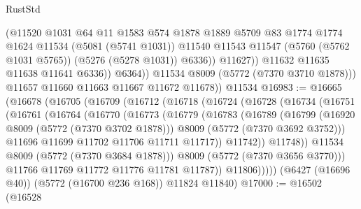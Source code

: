 \begin{lexlean}{RustStd}
\begin{coremodule}
                        (@11520
                          @1031
                          @64
                          @11
                          @1583
                          @574
                          @1878
                          @1889
                          @5709
                          @83
                          @1774
                          @1774
                          @1624
                          @11534
                          (@5081 (@5741 @1031))
                          @11540
                          @11543
                          @11547
                          (@5760 (@5762 @1031 @5765))
                          (@5276 (@5278 @1031))
                          @6336))
                      @11627))
                  @11632
                  @11635
                  @11638
                  @11641
                  @6336))
              @6364))
          @11534
          @8009
          (@5772 (@7370 @3710 @1878)))
        @11657
        @11660
        @11663
        @11667
        @11672
        @11678))
    @11534
@16983 := @16665
    (@16678
      (@16705
        (@16709
          (@16712
            (@16718
              (@16724
                (@16728
                  (@16734
                    (@16751
                      (@16761
                        (@16764
                          (@16770
                            (@16773
                              (@16779
                                (@16783
                                  (@16789
                                    (@16799
                                      (@16920 @8009 (@5772 (@7370 @3702 @1878)))
                                      @8009
                                      (@5772 (@7370 @3692 @3752)))
                                    @11696
                                    @11699
                                    @11702
                                    @11706
                                    @11711
                                    @11717))
                                @11742))
                            @11748))
                        @11534
                        @8009
                        (@5772 (@7370 @3684 @1878)))
                      @8009
                      (@5772 (@7370 @3656 @3770)))
                    @11766
                    @11769
                    @11772
                    @11776
                    @11781
                    @11787))
                @11806)))))
      (@6427 (@16696 @40))
      (@5772 (@16700 @236 @168))
      @11824
      @11840)
@17000 := @16502
    (@16528

\end{coremodule}
\end{lexlean}
